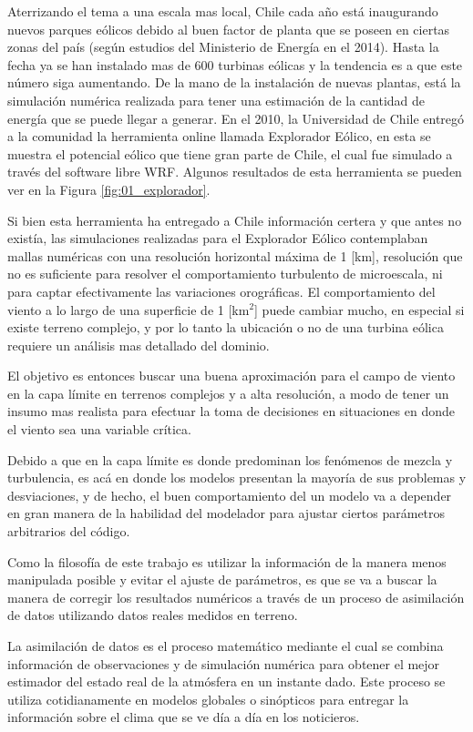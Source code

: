 Aterrizando el tema a una escala mas local, Chile cada año está inaugurando nuevos parques eólicos debido al buen factor de planta que se poseen en ciertas zonas del país (según estudios del Ministerio de Energía en el 2014). Hasta la fecha ya se han instalado mas de 600 turbinas eólicas y la tendencia es a que este número siga aumentando. De la mano de la instalación de nuevas plantas, está la simulación numérica realizada para tener una estimación de la cantidad de energía que se puede llegar a generar. En el 2010, la Universidad de Chile entregó a la comunidad la herramienta online llamada Explorador Eólico, en esta se muestra el potencial eólico que tiene gran parte de Chile, el cual fue simulado a través del software libre WRF. Algunos resultados de esta herramienta se pueden ver en la Figura \ref{fig:01_explorador}.


Si bien esta herramienta ha entregado a Chile información certera y que antes no existía, las simulaciones realizadas para el Explorador Eólico contemplaban mallas numéricas con una resolución horizontal máxima de 1 [km], resolución que no es suficiente para resolver el comportamiento turbulento de microescala, ni para captar efectivamente las variaciones orográficas. El comportamiento del viento a lo largo de una superficie de 1 [km$^2$] puede cambiar mucho, en especial si existe terreno complejo, y por lo tanto la ubicación o no de una turbina eólica requiere un análisis mas detallado del dominio.

El objetivo es entonces buscar una buena aproximación para el campo de viento en la capa límite en terrenos complejos y a alta resolución, a modo de tener un insumo mas realista para efectuar la toma de decisiones en situaciones en donde el viento sea una variable crítica.

Debido a que en la capa límite es donde predominan los fenómenos de mezcla y turbulencia, es acá en donde los modelos presentan la mayoría de sus problemas y desviaciones, y de hecho, el buen comportamiento del un modelo va a depender en gran manera de la habilidad del modelador para ajustar ciertos parámetros arbitrarios del código. 

Como la filosofía de este trabajo es utilizar la información de la manera menos manipulada posible y evitar el ajuste de parámetros, es que se va a buscar la manera de corregir los resultados numéricos a través de un proceso de asimilación de datos utilizando datos reales medidos en terreno.

La asimilación de datos es el proceso matemático mediante el cual se combina información de observaciones y de simulación numérica para obtener el mejor estimador del estado real de la atmósfera en un instante dado. Este proceso se utiliza cotidianamente en modelos globales o sinópticos para entregar la información sobre el clima que se ve día a día en los noticieros.

